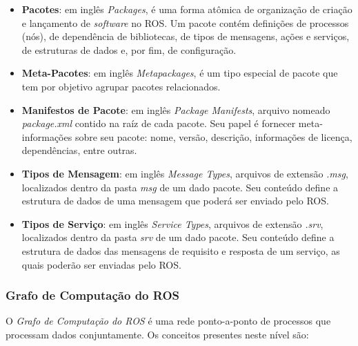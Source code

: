                 \begin{itemize}
                    \item \textbf{Pacotes}: em inglês \textit{Packages}, é uma forma atômica de organização de criação e lançamento de \textit{software} no ROS. Um pacote contém definições de processos (nós), de dependência de bibliotecas, de tipos de mensagens, ações e serviços, de estruturas de dados e, por fim, de configuração. 
                    
                    \item \textbf{Meta-Pacotes}: em inglês \textit{Metapackages}, é um tipo especial de pacote que tem por objetivo agrupar pacotes relacionados.
                    
                    \item \textbf{Manifestos de Pacote}: em inglês \textit{Package Manifests}, arquivo nomeado \textit{package.xml} contido na raíz de cada pacote. Seu papel é fornecer meta-informações sobre seu pacote: nome, versão, descrição, informações de licença, dependências, entre outras. 
                    
                    \item \textbf{Tipos de Mensagem}: em inglês \textit{Message Types}, arquivos de extensão \textit{.msg}, localizados dentro da pasta \textit{msg} de um dado pacote. Seu conteúdo define a estrutura de dados de uma mensagem que poderá ser enviado pelo ROS.
                    
                    \item \textbf{Tipos de Serviço}: em inglês \textit{Service Types}, arquivos de extensão \textit{.srv}, localizados dentro da pasta \textit{srv} de um dado pacote. Seu conteúdo define a estrutura de dados das mensagens de requisito e resposta de um serviço, as quais poderão ser enviadas pelo ROS.
                \end{itemize}
            
            \subsubsection{Grafo de Computação do ROS}
        
                O \textit{Grafo de Computação do ROS} é uma rede ponto-a-ponto de processos que processam dados conjuntamente. Os conceitos presentes neste nível são:
                
